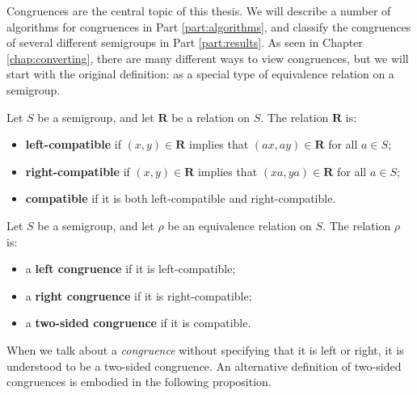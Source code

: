 Congruences are the central topic of this thesis.  We will describe a number of
algorithms for congruences in Part \ref{part:algorithms}, and classify the
congruences of several different semigroups in Part \ref{part:results}.
As seen in Chapter \ref{chap:converting}, there are many different ways to view
congruences, but we will start with the original definition: as a special type
of equivalence relation on a semigroup.

\begin{definition}
  \label{def:compatible}
  Let $S$ be a semigroup, and let $\mathbf{R}$ be a relation on $S$.  The
  relation $\mathbf{R}$ is:
  \begin{itemize}
  \item \textbf{left-compatible} if $(x, y) \in \mathbf{R}$ implies that
    $(ax, ay) \in \mathbf{R}$ for all $a \in S$;
  \item \textbf{right-compatible} if $(x, y) \in \mathbf{R}$ implies that
    $(xa, ya) \in \mathbf{R}$ for all $a \in S$;
  \item \textbf{compatible} if it is both left-compatible and
    right-compatible.
  \end{itemize}
\end{definition}

\begin{definition}
  \label{def:congruence}
  Let $S$ be a semigroup, and let $\rho$ be an equivalence relation on $S$.  The
  relation $\rho$ is:
  \begin{itemize}
  \item a \textbf{left congruence} if it is left-compatible;
  \item a \textbf{right congruence} if it is right-compatible;
  \item a \textbf{two-sided congruence} if it is compatible.
  \end{itemize}
\end{definition}

When we talk about a \textit{congruence} without specifying that it is left or
right, it is understood to be a two-sided congruence.   An alternative
definition of two-sided congruences is embodied in the following proposition.

